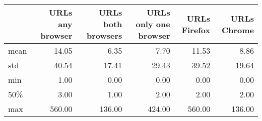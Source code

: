 \begin{tabular}{lrrrrr}
\toprule
{} &  URLs any browser &  URLs both browsers &  URLs  only one browser &  URLs Firefox &  URLs Chrome \\
\midrule
mean &             14.05 &                6.35 &                    7.70 &         11.53 &         8.86 \\
std  &             40.54 &               17.41 &                   29.43 &         39.52 &        19.64 \\
min  &              1.00 &                0.00 &                    0.00 &          0.00 &         0.00 \\
50\% &              3.00 &                1.00 &                    2.00 &          2.00 &         2.00 \\
max  &            560.00 &              136.00 &                  424.00 &        560.00 &       136.00 \\
\bottomrule
\end{tabular}
